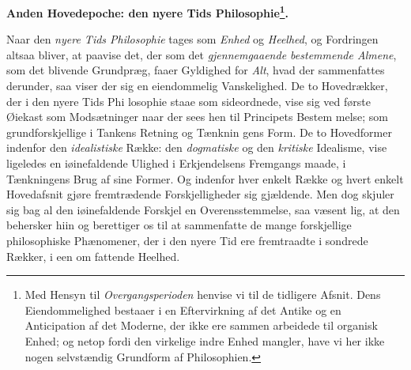 %
\begin{center}
\textbf{\large Anden Hovedepoche: den nyere Tids Philosophie\footnote{\normalfont\normalsize Med Hensyn til \emph{Overgangsperioden} henvise vi til de tidligere
Afsnit. Dens Eiendommelighed bestaaer i en Eftervirkning af det
Antike og en Anticipation af det Moderne, der ikke ere sammen\-%
arbeidede til organisk Enhed; og netop fordi den virkelige indre
Enhed mangler, have vi her ikke nogen selvstændig Grundform af
Philosophien.}.}
\end{center}

Naar den \emph{nyere Tids Philosophie} tages som \emph{Enhed}
og \emph{Heelhed}, og Fordringen altsaa bliver, at paavise det, der
som det \emph{gjennemgaaende bestemmende Almene}, som
det blivende Grundpræg, faaer Gyldighed for \emph{Alt}, hvad der
sammenfattes derunder, saa viser der sig en eiendommelig
Vanskelighed. De to Hovedrækker, der i den nyere Tids Phi\-%
losophie staae som sideordnede, vise sig ved første Øiekast
som Modsætninger naar der sees hen til Principets Bestem\-%
melse; som grundforskjellige i Tankens Retning og Tænknin\-%
gens Form. De to Hovedformer indenfor den \emph{idealistiske}
Række: den \emph{dogmatiske} og den \emph{kritiske} Idealisme, vise
ligeledes en iøinefaldende Ulighed i Erkjendelsens Fremgangs\-%
maade, i Tænkningens Brug af sine Former. Og indenfor hver
enkelt Række og hvert enkelt Hovedafsnit gjøre fremtrædende
Forskjelligheder sig gjældende. Men dog skjuler sig bag al
den iøinefaldende Forskjel en Overensstemmelse, saa væsent\-%
lig, at den behersker hiin og berettiger os til at sammenfatte
de mange forskjellige philosophiske Phænomener, der i den
nyere Tid ere fremtraadte i sondrede Rækker, i een om\-%
fattende Heelhed.

